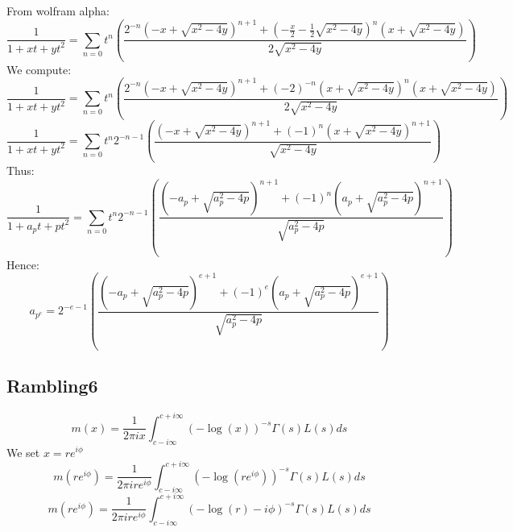 \documentclass[a4paper]{amsart}
\begin{document}
From wolfram alpha:
$$\frac{1}{1 + xt + yt^2} = \sum_{n = 0}t^n\left(\frac{2^{-n}\left(-x + \sqrt{x^2 - 4y}\right)^{n + 1} + \left(-\frac{x}{2} - \frac{1}{2}\sqrt{x^2 - 4y}\right)^n\left(x + \sqrt{x^2 - 4y}\right)}{2\sqrt{x^2 - 4y}}\right)$$
We compute:
$$\frac{1}{1 + xt + yt^2} = \sum_{n = 0}t^n\left(\frac{2^{-n}\left(-x + \sqrt{x^2 - 4y}\right)^{n + 1} + (-2)^{-n}\left(x + \sqrt{x^2 - 4y}\right)^n\left(x + \sqrt{x^2 - 4y}\right)}{2\sqrt{x^2 - 4y}}\right)$$
$$\frac{1}{1 + xt + yt^2} = \sum_{n = 0}t^n2^{-n - 1}\left(\frac{\left(-x + \sqrt{x^2 - 4y}\right)^{n + 1} + (-1)^n\left(x + \sqrt{x^2 - 4y}\right)^{n + 1}}{\sqrt{x^2 - 4y}}\right)$$
Thus:
$$\frac{1}{1 + a_pt + pt^2} = \sum_{n = 0}t^n2^{-n - 1}\left(\frac{\left(-a_p + \sqrt{a_p^2 - 4p}\right)^{n + 1} + (-1)^n\left(a_p + \sqrt{a_p^2 - 4p}\right)^{n + 1}}{\sqrt{a_p^2 - 4p}}\right)$$
Hence:
$$a_{p^e} = 2^{-e - 1}\left(\frac{\left(-a_p + \sqrt{a_p^2 - 4p}\right)^{e + 1} + (-1)^e\left(a_p + \sqrt{a_p^2 - 4p}\right)^{e + 1}}{\sqrt{a_p^2 - 4p}}\right)$$


\subsection{Rambling6}
$$m(x) = \frac{1}{2\pi i x} \int_{c - i\infty}^{c + i\infty}(-\log(x))^{-s} \Gamma(s)L(s)ds$$
We set $x = re^{i\phi}$
$$m(re^{i\phi}) = \frac{1}{2\pi i re^{i\phi}} \int_{c - i\infty}^{c + i\infty}(-\log(re^{i\phi}))^{-s} \Gamma(s)L(s)ds$$
$$m(re^{i\phi}) = \frac{1}{2\pi i re^{i\phi}} \int_{c - i\infty}^{c + i\infty}(-\log(r) - i\phi)^{-s} \Gamma(s)L(s)ds$$
\end{document}
